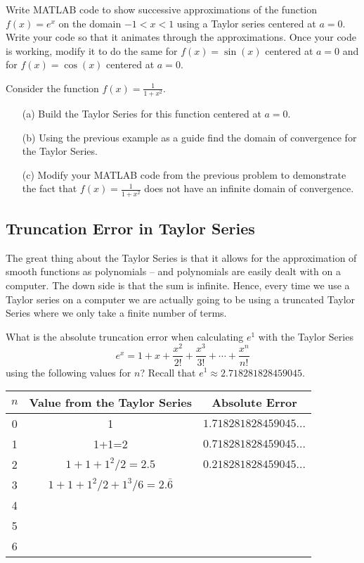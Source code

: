 \begin{problem}
    Write MATLAB code to show successive approximations of the function $f(x) = e^x$ on
    the domain $-1 < x < 1$ using a Taylor series centered at $a=0$.  Write your code so
    that it animates through the approximations.  Once your code is working, modify it to
    do the same for $f(x) = \sin(x)$ centered at $a=0$ and for $f(x) = \cos(x)$ centered
    at $a=0$.
\end{problem}

\begin{problem}
    Consider the function $f(x) = \frac{1}{1+x^2}$.  
    \begin{enumerate}
        \item[(a)] Build the Taylor Series for this function centered at $a=0$.
        \item[(b)] Using the previous example as a guide find the domain of convergence
            for the Taylor Series.
        \item[(c)] Modify your MATLAB code from the previous problem to demonstrate the
            fact that $f(x) = \frac{1}{1+x^2}$ does not have an infinite domain of
            convergence.
    \end{enumerate}
\end{problem}


\subsection{Truncation Error in Taylor Series}
The great thing about the Taylor Series is that it allows for the
approximation of smooth functions as polynomials -- and polynomials are easily dealt with on
a computer. The down side is that the sum is infinite.  Hence, every time we use a Taylor
series on a computer we are actually going to be using a truncated Taylor Series where we
only take a finite number of terms.  

\begin{problem}
    What is the absolute truncation error when calculating $e^1$ with the Taylor Series
    \[ e^x = 1 + x + \frac{x^2}{2!} + \frac{x^3}{3!} + \cdots + \frac{x^n}{n!} \]
    using the following values for $n$? Recall that $e^1 \approx 2.718281828459045$.
    \begin{center}
        \begin{tabular}{|c|c|c|}
            \hline
            $n$ & Value from the Taylor Series & Absolute Error \\ \hline \hline
            0 & 1 & $1.718281828459045\ldots$ \\ \hline
            1 & 1+1=2 & $0.718281828459045\ldots$ \\ \hline
            2 & $1+1+1^2/2=2.5$ & $0.218281828459045\ldots$ \\ \hline
            3 & $1+1+1^2/2+1^3/6=2.\bar{6}$ & \\ \hline
            4 & & \\ \hline
            5 & & \\ \hline
            6 & & \\ \hline
        \end{tabular}
    \end{center}
\end{problem}

